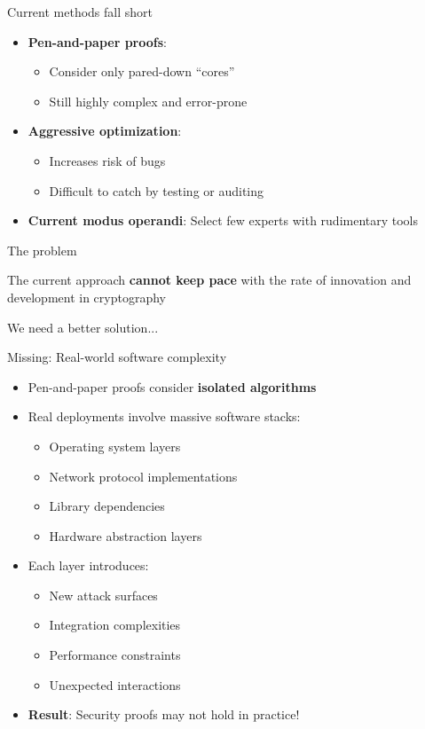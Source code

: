 \documentclass[aspectratio=169, lualatex, handout]{beamer}
\begin{document}
\begin{frame}{Current methods fall short}
	\begin{itemize}
		\item \textbf{Pen-and-paper proofs}:
		      \begin{itemize}
			      \item Consider only pared-down ``cores''
			      \item Still highly complex and error-prone
		      \end{itemize}
		\item \textbf{Aggressive optimization}:
		      \begin{itemize}
			      \item Increases risk of bugs
			      \item Difficult to catch by testing or auditing
		      \end{itemize}
		\item \textbf{Current modus operandi}: Select few experts with rudimentary tools
	\end{itemize}
\end{frame}

\begin{frame}{The problem}
	\begin{center}
		\Large
		The current approach \textbf{cannot keep pace} with the rate of innovation and development in cryptography
		\vspace{2em}

		\normalsize
		We need a better solution...
	\end{center}
\end{frame}

\begin{frame}{Missing: Real-world software complexity}
	\begin{itemize}
		\item Pen-and-paper proofs consider \textbf{isolated algorithms}
		\item Real deployments involve massive software stacks:
		      \begin{itemize}
			      \item Operating system layers
			      \item Network protocol implementations
			      \item Library dependencies
			      \item Hardware abstraction layers
		      \end{itemize}
		\item Each layer introduces:
		      \begin{itemize}
			      \item New attack surfaces
			      \item Integration complexities
			      \item Performance constraints
			      \item Unexpected interactions
		      \end{itemize}
		\item \textbf{Result}: Security proofs may not hold in practice!
	\end{itemize}
\end{frame}
\end{document}

